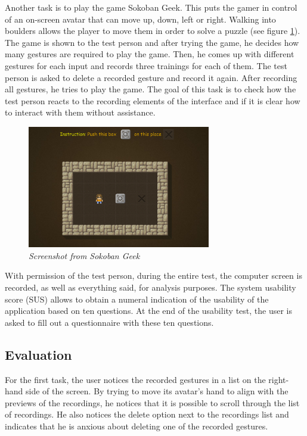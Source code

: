 Another task is to play the game Sokoban Geek. This puts the gamer in control of an on-screen avatar that can move up, down, left or right. Walking into boulders allows the player to move them in order to solve a puzzle (see figure \ref{fig: sokoban_geek}). The game is shown to the test person and after trying the game, he decides how many gestures are required to play the game. Then, he comes up with different gestures for each input and records three trainings for each of them. The test person is asked to delete a recorded gesture and record it again. After recording all gestures, he tries to play the game. The goal of this task is to check how the test person reacts to the recording elements of the interface and if it is clear how to interact with them without assistance.\\

\begin{figure}[H]
\begin{center}
\includegraphics[width=8cm]{SokobanGeek.png}
\caption{\emph{Screenshot from Sokoban Geek}}
\label{fig: sokoban_geek}
\end{center}
\end{figure}

With permission of the test person, during the entire test, the computer screen is recorded, as well as everything said, for analysis purposes. The system usability score (SUS) allows to obtain a numeral indication of the usability of the application based on ten questions. At the end of the usability test, the user is asked to fill out a questionnaire with these ten questions.


\subsection{Evaluation}

For the first task, the user notices the recorded gestures in a list on the right-hand side of the screen. By trying to move its avatar's hand to align with the previews of the recordings, he notices that it is possible to scroll through the list of recordings. He also notices the delete option next to the recordings list and indicates that he is anxious about deleting one of the recorded gestures.\\

